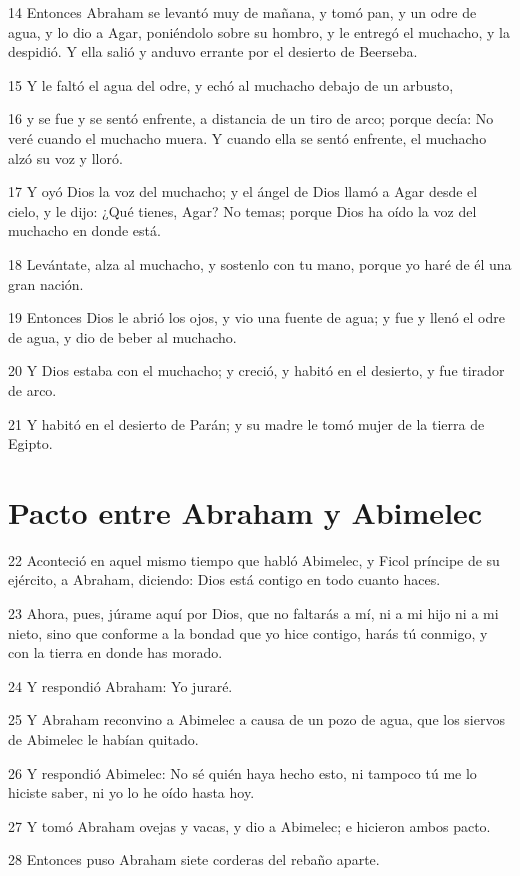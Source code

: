 14 Entonces Abraham se levantó muy de mañana, y tomó pan, y un odre de agua, y lo dio a Agar, poniéndolo sobre su hombro, y le entregó el muchacho, y la despidió. Y ella salió y anduvo errante por el desierto de Beerseba.

15 Y le faltó el agua del odre, y echó al muchacho debajo de un arbusto,

16 y se fue y se sentó enfrente, a distancia de un tiro de arco; porque decía: No veré cuando el muchacho muera. Y cuando ella se sentó enfrente, el muchacho alzó su voz y lloró.

17 Y oyó Dios la voz del muchacho; y el ángel de Dios llamó a Agar desde el cielo, y le dijo: ¿Qué tienes, Agar? No temas; porque Dios ha oído la voz del muchacho en donde está.

18 Levántate, alza al muchacho, y sostenlo con tu mano, porque yo haré de él una gran nación.

19 Entonces Dios le abrió los ojos, y vio una fuente de agua; y fue y llenó el odre de agua, y dio de beber al muchacho.

20 Y Dios estaba con el muchacho; y creció, y habitó en el desierto, y fue tirador de arco.

21 Y habitó en el desierto de Parán; y su madre le tomó mujer de la tierra de Egipto.

\section{Pacto entre Abraham y Abimelec}

22 Aconteció en aquel mismo tiempo que habló Abimelec, y Ficol príncipe de su ejército, a Abraham, diciendo: Dios está contigo en todo cuanto haces.

23 Ahora, pues, júrame aquí por Dios, que no faltarás a mí, ni a mi hijo ni a mi nieto, sino que conforme a la bondad que yo hice contigo, harás tú conmigo, y con la tierra en donde has morado.

24 Y respondió Abraham: Yo juraré.

25 Y Abraham reconvino a Abimelec a causa de un pozo de agua, que los siervos de Abimelec le habían quitado.

26 Y respondió Abimelec: No sé quién haya hecho esto, ni tampoco tú me lo hiciste saber, ni yo lo he oído hasta hoy.

27 Y tomó Abraham ovejas y vacas, y dio a Abimelec; e hicieron ambos pacto.

28 Entonces puso Abraham siete corderas del rebaño aparte.

